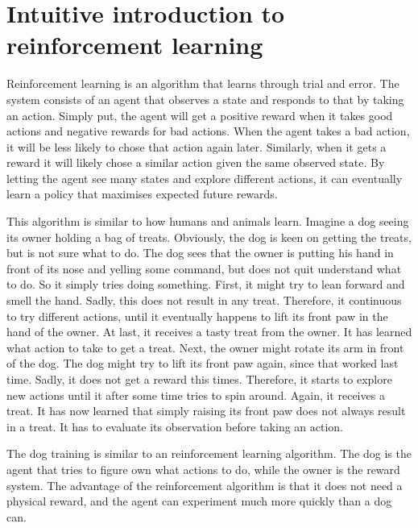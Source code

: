 \documentclass[class=book, crop=false]{standalone}
\begin{document}
\section{Intuitive introduction to reinforcement learning}
Reinforcement learning is an algorithm that learns through trial and error. The system consists of an agent that observes a state and responds to that by taking an action. Simply put, the agent will get a positive reward when it takes good actions and negative rewards for bad actions. When the agent takes a bad action, it will be less likely to chose that action again later. Similarly, when it gets a reward it will likely chose a similar action given the same observed state. By letting the agent see many states and explore different actions, it can eventually learn a policy that maximises expected future rewards. 

This algorithm is similar to how humans and animals learn. Imagine a dog seeing its owner holding a bag of treats. Obviously, the dog is keen on getting the treats, but is not sure what to do. The dog sees that the owner is putting his hand in front of its nose and yelling some command, but does not quit understand what to do. So it simply tries doing something. First, it might try to lean forward and smell the hand. Sadly, this does not result in any treat. Therefore, it continuous to try different actions, until it eventually happens to lift its front paw in the hand of the owner. At last, it receives a tasty treat from the owner. It has learned what action to take to get a treat. Next, the owner might rotate its arm in front of the dog. The dog might try to lift its front paw again, since that worked last time. Sadly, it does not get a reward this times. Therefore, it starts to explore new actions until it after some time tries to spin around. Again, it receives a treat. It has now learned that simply raising its front paw does not always result in a treat. It has to evaluate its observation before taking an action. 

The dog training is similar to an reinforcement learning algorithm. The dog is the agent that tries to figure own what actions to do, while the owner is the reward system. The advantage of the reinforcement algorithm is that it does not need a physical reward, and the agent can experiment much more quickly than a dog can. 
\end{document}
